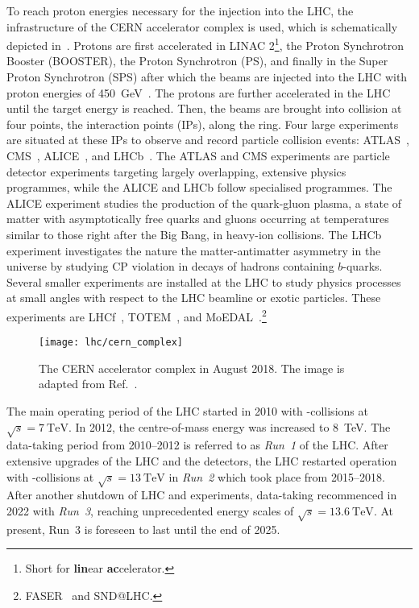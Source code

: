 To reach proton energies necessary for the injection into the LHC, the
infrastructure of the CERN accelerator complex is used, which is schematically
depicted in~. Protons are first accelerated
in LINAC 2\footnote{Short for \textbf{lin}ear \textbf{ac}celerator.}, the Proton
Synchrotron Booster (BOOSTER), the Proton Synchrotron (PS), and finally in the
Super Proton Synchrotron (SPS) after which the beams are injected into the LHC
with proton energies of \SI{450}{\GeV}~\cite{Evans:2008zzb}. The protons are
further accelerated in the LHC until the target energy is reached. Then, the
beams are brought into collision at four points, the interaction points (IPs),
along the ring. Four large experiments are situated at these IPs to observe and
record particle collision events: ATLAS~\cite{PERF-2007-01},
CMS~\cite{CMS-CMS-00-001}, ALICE~\cite{ALICE:2008ngc}, and
LHCb~\cite{LHCb:2008vvz}. The ATLAS and CMS experiments are particle detector
experiments targeting largely overlapping, extensive physics programmes, while
the ALICE and LHCb follow specialised programmes. The ALICE experiment studies
the production of the quark-gluon plasma, a state of matter with asymptotically
free quarks and gluons occurring at temperatures similar to those right after
the Big Bang, in heavy-ion collisions. The LHCb experiment investigates the
nature the matter-antimatter asymmetry in the universe by studying CP violation
in decays of hadrons containing $b$-quarks. Several smaller experiments are
installed at the LHC to study physics processes at small angles with respect to
the LHC beamline or exotic particles. These experiments are
LHCf~\cite{LHCf:2008lfy}, TOTEM~\cite{TOTEM:2008lue}, and
MoEDAL~\cite{MoEDAL:2009jwa}.\footnote{FASER~\cite{FASER:2019aik} and SND@LHC.}

\begin{figure}[htbp]
  \centering

  \texttt{[image: lhc/cern\_complex]}

  \caption{The CERN accelerator complex in August 2018. The image is adapted
    from Ref.~\cite{Mobs:2684277}.}%
  \label{fig:cern_accelerator_complex}
\end{figure}

The main operating period of the LHC started in 2010 with \pp-collisions at
$\sqrt{s} = \SI{7}{\TeV}$. In 2012, the centre-of-mass energy was increased to
\SI{8}{\TeV}. The data-taking period from 2010--2012 is referred to as
\emph{Run~1} of the LHC. After extensive upgrades of the LHC and the detectors,
the LHC restarted operation with \pp-collisions at $\sqrt{s} = \SI{13}{\TeV}$ in
\emph{Run~2} which took place from 2015--2018. After another shutdown of LHC and
experiments, data-taking recommenced in 2022 with \emph{Run~3}, reaching
unprecedented energy scales of $\sqrt{s} = \SI{13.6}{\TeV}$. At present, Run~3
is foreseen to last until the end of 2025.

